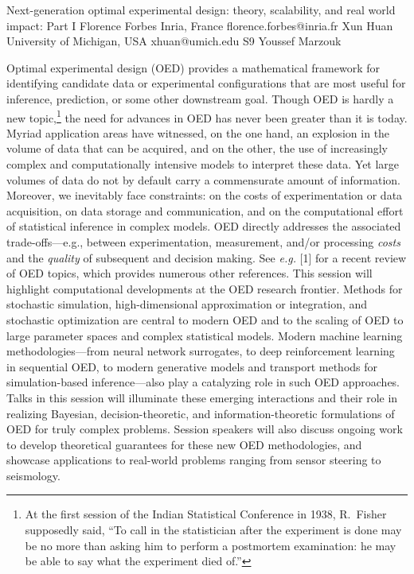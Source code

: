 \begin{session}
 {Next-generation optimal experimental design: theory, scalability, and real world impact: Part I}%
 {Florence Forbes}%
 {Inria, France}%
 {florence.forbes@inria.fr}%
 {Xun Huan}%
 {University of Michigan, USA}%
 {xhuan@umich.edu}%
 {S9}%
 {Youssef Marzouk}%

 Optimal experimental design (OED) provides a mathematical framework for identifying candidate data or experimental configurations that are most useful for inference, prediction, or some other downstream goal. Though OED is hardly a new topic,\footnote{At the first session of the Indian Statistical Conference in 1938, R.\ Fisher supposedly said, ``To call in the statistician after the experiment is done may be no more than asking him to perform a postmortem examination: he may be able to say what the experiment died of.''} the need for advances in OED has never been greater than it is today. Myriad application areas have witnessed, on the one hand, an explosion in the volume of data that can be acquired, and on the other, the use of increasingly complex and computationally intensive models to interpret these data. Yet large volumes of data do not by default carry a commensurate amount of information. Moreover, we inevitably face constraints: on the costs of experimentation or data acquisition, on data storage and communication, and on the computational effort of statistical inference in complex models. OED directly addresses the associated trade-offs---e.g., between experimentation, measurement, and/or processing \textit{costs} and
 the \textit{quality} of subsequent and decision making. See {\it e.g.} [1] for a recent review of OED topics, which provides numerous other references.
 This session will highlight computational developments at the OED research frontier. Methods for stochastic simulation, high-dimensional approximation or integration, and stochastic optimization are central to modern OED and to the scaling of OED to large parameter spaces and complex statistical models. Modern machine learning methodologies---from neural network surrogates, to deep reinforcement learning in sequential OED, to modern generative models and transport methods for simulation-based inference---also play a catalyzing role in such OED approaches. Talks in this session will illuminate these emerging interactions and their role in realizing Bayesian, decision-theoretic, and information-theoretic formulations of OED for truly complex problems. Session speakers will also discuss ongoing work to develop theoretical guarantees for these new OED methodologies, and showcase applications to real-world problems ranging from sensor steering to seismology.

\end{session}
